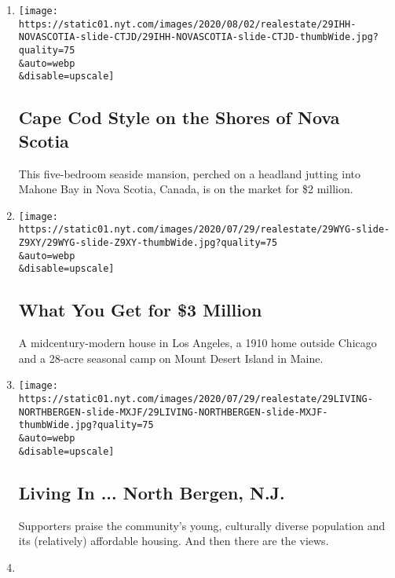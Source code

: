 \begin{enumerate}
\def\labelenumi{\arabic{enumi}.}
\item
  \href{/slideshow/2020/07/29/realestate/cape-cod-style-on-the-shores-of-nova-scotia.html}{}

  \texttt{[image: https://static01.nyt.com/images/2020/08/02/realestate/29IHH-NOVASCOTIA-slide-CTJD/29IHH-NOVASCOTIA-slide-CTJD-thumbWide.jpg?quality=75\\\&auto=webp\\\&disable=upscale]}

  \hypertarget{cape-cod-style-on-the-shores-of-nova-scotia}{%
  \subsection{Cape Cod Style on the Shores of Nova
  Scotia}\label{cape-cod-style-on-the-shores-of-nova-scotia}}

  This five-bedroom seaside mansion, perched on a headland jutting into
  Mahone Bay in Nova Scotia, Canada, is on the market for \$2 million.
\item
  \href{/slideshow/2020/07/29/realestate/what-you-get-for-3-million.html}{}

  \texttt{[image: https://static01.nyt.com/images/2020/07/29/realestate/29WYG-slide-Z9XY/29WYG-slide-Z9XY-thumbWide.jpg?quality=75\\\&auto=webp\\\&disable=upscale]}

  \hypertarget{what-you-get-for-3-million}{%
  \subsection{What You Get for \$3
  Million}\label{what-you-get-for-3-million}}

  A midcentury-modern house in Los Angeles, a 1910 home outside Chicago
  and a 28-acre seasonal camp on Mount Desert Island in Maine.
\item
  \href{/slideshow/2020/07/29/realestate/living-in-north-bergen-nj.html}{}

  \texttt{[image: https://static01.nyt.com/images/2020/07/29/realestate/29LIVING-NORTHBERGEN-slide-MXJF/29LIVING-NORTHBERGEN-slide-MXJF-thumbWide.jpg?quality=75\\\&auto=webp\\\&disable=upscale]}

  \hypertarget{living-in--north-bergen-nj}{%
  \subsection{Living In ... North Bergen,
  N.J.}\label{living-in--north-bergen-nj}}

  Supporters praise the community's young, culturally diverse population
  and its (relatively) affordable housing. And then there are the views.
\item
  \href{/2020/07/28/business/recent-commercial-real-estate-transactions.html}{}


\end{enumerate}
